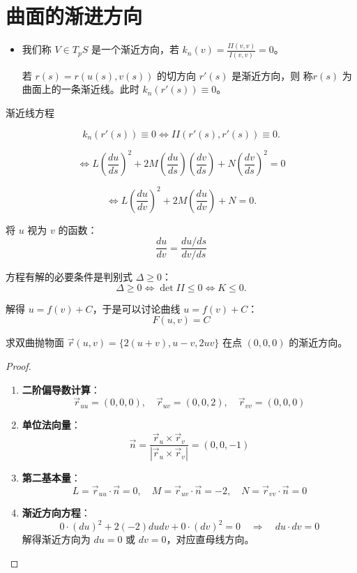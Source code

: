 \documentclass[lang=cn,10pt,thmcnt=section]{elegantbook}
\begin{document}
\section{曲面的渐进方向}
\begin{itemize}
    \item 我们称 \( V \in T_pS \) 是一个渐近方向，若 \( k_n(v) = \frac{II(v, v)}{I(v,v)} = 0 \)。

    若 \( r(s) = r(u(s), v(s)) \) 的切方向 \( r'(s) \) 是渐近方向，则 称\( r(s) \) 为曲面上的一条渐近线。此时 \( k_n(r'(s)) \equiv 0 \)。  
\end{itemize}

渐近线方程

\[ k_n(r'(s)) \equiv 0 \iff II(r'(s), r'(s)) \equiv 0. \]

\[
\Leftrightarrow L\left( \frac{du}{ds} \right)^2 + 2M\left( \frac{du}{ds} \right) \left( \frac{dv}{ds} \right) + N\left( \frac{dv}{ds} \right)^2 = 0
\]

\[
\Leftrightarrow L\left( \frac{du}{dv} \right)^2 + 2M\left( \frac{du}{dv} \right) + N = 0.
\]

将 \( u \) 视为 \( v \) 的函数：
\[
\frac{du}{dv} = \frac{du/ds}{dv/ds}
\]

方程有解的必要条件是判别式 \( \Delta \geq 0 \)：
\[
\Delta \geq 0 \iff \det II\leq 0 \iff K \leq 0.
\]

解得 \( u = f(v) + C \)，于是可以讨论曲线 \( u = f(v) + C \)：
\[
F(u,v) = C
\]

\begin{example}
	求双曲抛物面 $\vec{r}(u,v) = \{2(u+v), u-v, 2uv\}$ 在点 $(0,0,0)$ 的渐近方向。
\end{example}
\begin{proof}
	\begin{enumerate}
		\item \textbf{二阶偏导数计算}：
		\[
			\vec{r}_{uu} = (0,0,0), \quad 
			\vec{r}_{uv} = (0,0,2), \quad 
			\vec{r}_{vv} = (0,0,0)
		\]
		
		\item \textbf{单位法向量}：
		\[
			\vec{n} = \frac{\vec{r}_u \times \vec{r}_v}{|\vec{r}_u \times \vec{r}_v|} = (0,0,-1)
		\]
		
		\item \textbf{第二基本量}：
		\[
			L = \vec{r}_{uu} \cdot \vec{n} = 0, \quad 
			M = \vec{r}_{uv} \cdot \vec{n} = -2, \quad 
			N = \vec{r}_{vv} \cdot \vec{n} = 0
		\]
		
		\item \textbf{渐近方向方程}：
		\[
			0 \cdot (du)^2 + 2(-2) du dv + 0 \cdot (dv)^2 = 0 \quad \Rightarrow \quad du \cdot dv = 0
		\]
		解得渐近方向为 $\boxed{du=0}$ 或 $\boxed{dv=0}$，对应直母线方向。
	\end{enumerate}
\end{proof}
\end{document}
